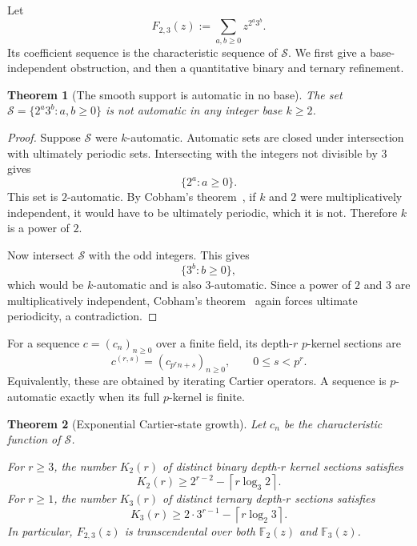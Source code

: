 \documentclass[11pt]{article}
\newtheorem{theorem}{Theorem}[section]
\theoremstyle{definition}
\newcommand{\F}{\mathbb{F}}
\newcommand{\smooth}{\mathcal{S}}
\begin{document}
Let
\[
       F_{2,3}(z):=\sum_{a,b\geq0}z^{2^a3^b}.
\]
Its coefficient sequence is the characteristic sequence of $\smooth$.  We
first give a base-independent obstruction, and then a quantitative binary and
ternary refinement.

\begin{theorem}[The smooth support is automatic in no base]
\label{thm:no-base-automatic}
The set $\smooth=\{2^a3^b:a,b\geq0\}$ is not automatic in any integer base
$k\geq2$.
\end{theorem}

\begin{proof}
Suppose $\smooth$ were $k$-automatic.  Automatic sets are closed under
intersection with ultimately periodic sets.  Intersecting with the integers
not divisible by $3$ gives
\[
       \{2^a:a\geq0\}.
\]
This set is $2$-automatic.  By Cobham's theorem~\cite{Cobham}, if $k$ and $2$ were
multiplicatively independent, it would have to be ultimately periodic, which
it is not.  Therefore $k$ is a power of $2$.

Now intersect $\smooth$ with the odd integers.  This gives
\[
       \{3^b:b\geq0\},
\]
which would be $k$-automatic and is also $3$-automatic.  Since a power of $2$
and $3$ are multiplicatively independent, Cobham's theorem~\cite{Cobham} again forces
ultimate periodicity, a contradiction.
\end{proof}

For a sequence $c=(c_n)_{n\geq0}$ over a finite field, its depth-$r$
$p$-kernel sections are
\[
       c^{(r,s)}=(c_{p^r n+s})_{n\geq0},
       \qquad 0\leq s<p^r.
\]
Equivalently, these are obtained by iterating Cartier operators.  A sequence
is $p$-automatic exactly when its full $p$-kernel is finite.

\begin{theorem}[Exponential Cartier-state growth]
\label{thm:cartier-growth}
Let $c_n$ be the characteristic function of $\smooth$.

For $r\geq3$, the number $K_2(r)$ of distinct binary depth-$r$ kernel sections
satisfies
\[
 K_2(r)\geq
  2^{r-2}-\left\lceil r\log_3 2\right\rceil.
\]
For $r\geq1$, the number $K_3(r)$ of distinct ternary depth-$r$ sections
satisfies
\[
 K_3(r)\geq
  2\cdot3^{r-1}-\left\lceil r\log_2 3\right\rceil.
\]
In particular, $F_{2,3}(z)$ is transcendental over both
$\F_2(z)$ and $\F_3(z)$.
\end{theorem}
\end{document}
